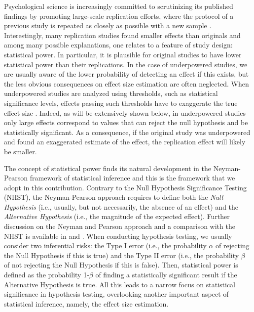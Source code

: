 \documentclass{article}\usepackage[]{graphicx}\usepackage[]{color}
\begin{document}
Psychological science is increasingly committed to scrutinizing its published findings by promoting large-scale replication efforts, where the protocol of a previous study is repeated as closely as possible with a new sample \parencite{camererEvaluatingReplicabilityLaboratory2016, camererEvaluatingReplicabilitySocial2018, ebersoleManyLabsEvaluating2016, kleinInvestigatingVariationReplicability2014, kleinManyLabsInvestigating2018, opensciencecollaborationEstimatingReproducibilityPsychological2015}. Interestingly, many replication studies found smaller effects than originals \parencite{camererEvaluatingReplicabilitySocial2018, opensciencecollaborationEstimatingReproducibilityPsychological2015} and among many possible explanations, one relates to a feature of study design: statistical power. In particular, it is plausible for original studies to have lower statistical power than their replications. In the case of underpowered studies, we are usually aware of the lower probability of detecting an effect if this exists, but the less obvious consequences on effect size estimation are often neglected. When underpowered studies are analyzed using thresholds, such as statistical significance levels, effects passing such thresholds have to exaggerate the true effect size \parencite{buttonPowerFailureWhy2013, gelmanTypeErrorMight2017, ioannidisWhyMostDiscovered2008, ioannidisEmergenceLargeTreatment2013, laneEstimatingEffectSize1978}. Indeed, as will be extensively shown below, in underpowered studies only large effects correspond to values that can reject the null hypothesis and be statistically significant. As a consequence, if the original study was underpowered and found an exaggerated estimate of the effect, the replication effect will likely be smaller.

The concept of statistical power finds its natural development in the Neyman-Pearson framework of statistical inference and this is the framework that we adopt in this contribution. Contrary to the Null Hypothesis Significance Testing (NHST), the Neyman-Pearson approach requires to define both the \textit{Null Hypothesis} (i.e., usually, but not necessarily, the absence of an effect) and the \textit{Alternative Hypothesis} (i.e., the magnitude of the expected effect). Further discussion on the Neyman and Pearson approach and a comparison with the NHST is available in \textcite{altoeEnhancingStatisticalInference2020} and \textcite{gigerenzerNullRitualWhat2004}.
When conducting hypothesis testing, we usually consider two inferential risks: the Type I error (i.e., the probability $\alpha$ of rejecting the Null Hypothesis if this is true) and the Type II error (i.e., the probability $\beta$ of not rejecting the Null Hypothesis if this is false). Then, statistical power is defined as the probability 1-$\beta$ of finding a statistically significant result if the Alternative Hypothesis is true. All this leads to a narrow focus on statistical significance in hypothesis testing, overlooking another important aspect of statistical inference, namely, the effect size estimation.
\end{document}
